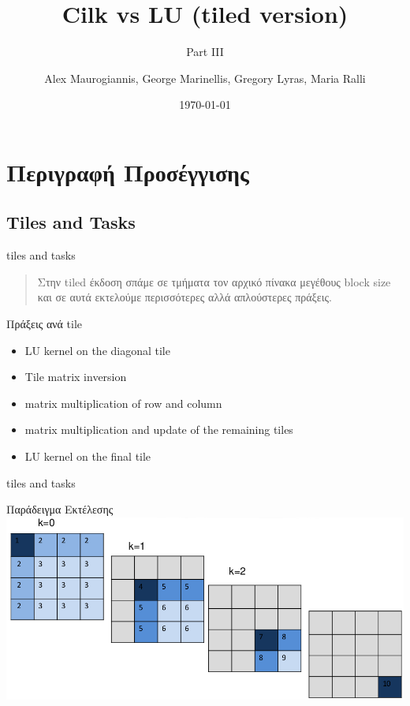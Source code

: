 \documentclass{beamer}
\author[afein,fedjo,mastergreg,mariaral]{Alex Maurogiannis, George Marinellis, Gregory Lyras, Maria Ralli}
\institute{CSlab @ NTUA}
\title{Cilk vs LU (tiled version)}
\subtitle{Part III}
\date{\today}
\begin{document}
\begin{frame}
    \titlepage
\end{frame}

\section{Περιγραφή Προσέγγισης}
\subsection{Tiles and Tasks}
\begin{frame}{tiles and tasks}
    \begin{quote}
        Στην tiled έκδοση σπάμε σε τμήματα τον αρχικό πίνακα μεγέθους block size
        και σε αυτά εκτελούμε περισσότερες αλλά απλούστερες πράξεις.
    \end{quote}
    \pause

    \begin{block}{Πράξεις ανά tile}
        \begin{itemize}
            \item<2-> LU kernel on the diagonal tile
            \item<3-> Tile matrix inversion
            \item<4-> matrix multiplication of row and column
            \item<5-> matrix multiplication and update of the remaining tiles
            \item<6-> LU kernel on the final tile
            
        \end{itemize}
    \end{block}

\end{frame}

\begin{frame}{tiles and tasks}
    \begin{block}{Παράδειγμα Εκτέλεσης}
        \includegraphics[width=\textwidth]{files/pps-ex2-pres_tables.png}
    \end{block}
\end{frame}
\end{document}
